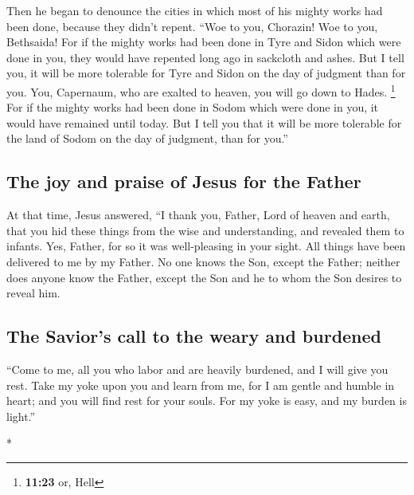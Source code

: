 \begin{paracol}{2}
\begin{otherlanguage}{english}
 Then he began to denounce the cities in which most of
his mighty works had been done, because they didn't repent.
 ``Woe to you, Chorazin! Woe to you, Bethsaida! For if
the mighty works had been done in Tyre and Sidon which were done in you,
they would have repented long ago in sackcloth and ashes.
 But I tell you, it will be more tolerable for Tyre and
Sidon on the day of judgment than for you.  You,
Capernaum, who are exalted to heaven, you will go down to Hades.
\footnote{\textbf{11:23} or, Hell} For if the mighty works had been done
in Sodom which were done in you, it would have remained until today.
 But I tell you that it will be more tolerable for the
land of Sodom on the day of judgment, than for you.''

\hypertarget{the-joy-and-praise-of-jesus-for-the-father}{%
\subsection{The joy and praise of Jesus for the
Father}\label{the-joy-and-praise-of-jesus-for-the-father}}

 At that time, Jesus answered, ``I thank you, Father,
Lord of heaven and earth, that you hid these things from the wise and
understanding, and revealed them to infants.  Yes,
Father, for so it was well-pleasing in your sight.  All
things have been delivered to me by my Father. No one knows the Son,
except the Father; neither does anyone know the Father, except the Son
and he to whom the Son desires to reveal him.

\hypertarget{the-saviors-call-to-the-weary-and-burdened}{%
\subsection{The Savior's call to the weary and
burdened}\label{the-saviors-call-to-the-weary-and-burdened}}

 ``Come to me, all you who labor and are heavily
burdened, and I will give you rest.  Take my yoke upon
you and learn from me, for I am gentle and humble in heart; and you will
find rest for your souls.  For my yoke is easy, and my
burden is light.''

\end{otherlanguage}

\switchcolumn[0]*

\hypertarget{los-ouxeddos-de-los-discuxedpulos-en-suxe1bado-la-primera-disputa-de-jesuxfas-con-los-fariseos-sobre-la-santificaciuxf3n-del-duxeda-de-reposo}{%
}
\end{paracol}
